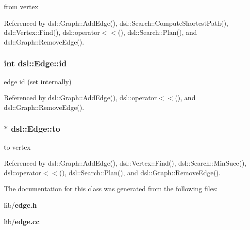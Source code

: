 from vertex 



Referenced by dsl\-::\-Graph\-::\-Add\-Edge(), dsl\-::\-Search\-::\-Compute\-Shortest\-Path(), dsl\-::\-Vertex\-::\-Find(), dsl\-::operator$<$$<$(), dsl\-::\-Search\-::\-Plan(), and dsl\-::\-Graph\-::\-Remove\-Edge().

\subsubsection[{id}]{\setlength{\rightskip}{0pt plus 5cm}int dsl\-::\-Edge\-::id}\label{classdsl_1_1Edge_a274a19c8792a79675b643098c2524b84}


edge id (set internally) 



Referenced by dsl\-::\-Graph\-::\-Add\-Edge(), dsl\-::operator$<$$<$(), and dsl\-::\-Graph\-::\-Remove\-Edge().

\subsubsection[{to}]{$\ast$ dsl\-::\-Edge\-::to}\label{classdsl_1_1Edge_aa2f851d9d63e51cf54b5d10412ef7735}


to vertex 



Referenced by dsl\-::\-Graph\-::\-Add\-Edge(), dsl\-::\-Vertex\-::\-Find(), dsl\-::\-Search\-::\-Min\-Succ(), dsl\-::operator$<$$<$(), dsl\-::\-Search\-::\-Plan(), and dsl\-::\-Graph\-::\-Remove\-Edge().



The documentation for this class was generated from the following files\-:\begin{DoxyCompactItemize}
\item 
lib/{\bf edge.\-h}\item 
lib/{\bf edge.\-cc}\end{DoxyCompactItemize}
